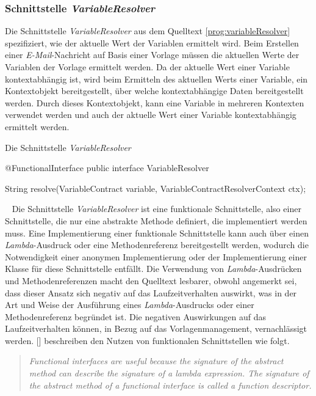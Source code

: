 \subsubsection{Schnittstelle \emph{VariableResolver}}
\label{sec:variableResolver}
Die Schnittstelle \emph{VariableResolver} aus dem Quelltext  \ref{prog:variableResolver} spezifiziert, wie der aktuelle Wert der Variablen ermittelt wird. 
\newline
\newline
Beim Erstellen einer \emph{E-Mail}-Nachricht auf Basis einer Vorlage müssen die aktuellen Werte der Variablen der Vorlage ermittelt werden. Da der aktuelle Wert einer Variable kontextabhängig ist, wird beim Ermitteln des aktuellen Werts einer Variable, ein Kontextobjekt bereitgestellt, über welche kontextabhängige Daten  bereitgestellt werden. Durch dieses Kontextobjekt, kann eine Variable in mehreren Kontexten verwendet werden und auch der aktuelle Wert einer Variable kontextabhängig ermittelt werden.
\begin{program}[h]
\caption{Die Schnittstelle \emph{VariableResolver}}
\label{prog:variableResolver}
\begin{JavaCode}
@FunctionalInterface
public interface VariableResolver {

    String resolve(VariableContract variable,
                   VariableContractResolverContext ctx);
                   
}
\end{JavaCode}
\end{program}
\ \newline
Die Schnittstelle \emph{VariableResolver} ist eine funktionale Schnittstelle, also einer Schnittstelle, die nur eine abstrakte Methode definiert, die implementiert werden muss. Eine Implementierung einer funktionale Schnittstelle kann auch über einen \emph{Lambda}-Ausdruck oder eine Methodenreferenz bereitgestellt werden, wodurch die Notwendigkeit einer anonymen Implementierung oder der Implementierung einer Klasse für diese Schnittstelle entfällt. Die Verwendung von \emph{Lambda}-Ausdrücken und Methodenreferenzen macht den Quelltext lesbarer, obwohl angemerkt sei, dass dieser Ansatz sich negativ auf das Laufzeitverhalten auswirkt, was in der Art und Weise der Ausführung eines \emph{Lambda}-Ausdrucks oder einer Methodenreferenz begründet ist. Die negativen Auswirkungen auf das Laufzeitverhalten können, in Bezug auf das Vorlagenmanagement, vernachlässigt werden. [\cite[50]{java8InAction}] beschreiben den Nutzen von funktionalen Schnittstellen wie folgt.
\begin{quote}
\emph{Functional interfaces are useful because the signature of the abstract method can describe the signature of a lambda expression. The signature of the abstract method of a functional interface is called a function descriptor.}
\end{quote}

